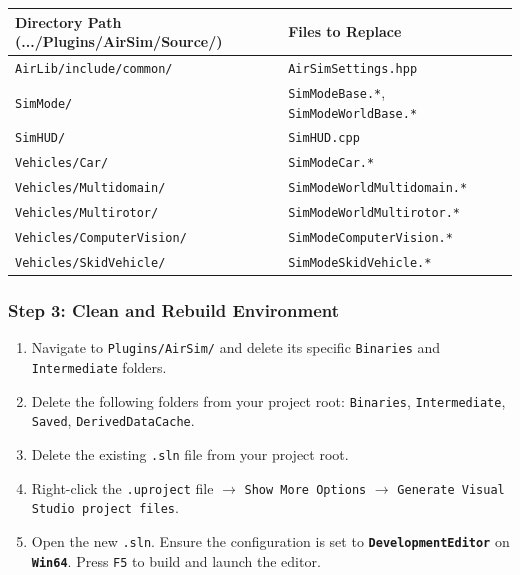 \begin{table}[H]
\centering
\small
\begin{tabular}{lll}
\toprule
\textbf{Directory Path (.../Plugins/AirSim/Source/)} & \textbf{Files to Replace} \\ \midrule
\texttt{AirLib/include/common/}        & \texttt{AirSimSettings.hpp} \\
\texttt{SimMode/}                      & \texttt{SimModeBase.*}, \texttt{SimModeWorldBase.*} \\
\texttt{SimHUD/}                       & \texttt{SimHUD.cpp} \\
\texttt{Vehicles/Car/}                 & \texttt{SimModeCar.*} \\
\texttt{Vehicles/Multidomain/}         & \texttt{SimModeWorldMultidomain.*} \\
\texttt{Vehicles/Multirotor/}          & \texttt{SimModeWorldMultirotor.*} \\
\texttt{Vehicles/ComputerVision/}      & \texttt{SimModeComputerVision.*} \\
\texttt{Vehicles/SkidVehicle/}         & \texttt{SimModeSkidVehicle.*} \\ \bottomrule
\end{tabular}
\end{table}

\subsubsection{Step 3: Clean and Rebuild Environment}
\begin{enumerate}[label=\alph*.]
     \item Navigate to \texttt{Plugins/AirSim/} and delete its specific \texttt{Binaries} and \texttt{Intermediate} folders.
    \item Delete the following folders from your project root: 
    \texttt{Binaries}, \texttt{Intermediate}, \texttt{Saved}, \texttt{DerivedDataCache}.
    \item Delete the existing \texttt{.sln} file from your project root.
    \item Right-click the \texttt{.uproject} file $\rightarrow$ \texttt{Show More Options} $\rightarrow$ \texttt{Generate Visual Studio project files}.
    \item Open the new \texttt{.sln}. Ensure the configuration is set to \textbf{\texttt{DevelopmentEditor}} on \textbf{\texttt{Win64}}. Press \texttt{F5} to build and launch the editor.
\end{enumerate}
